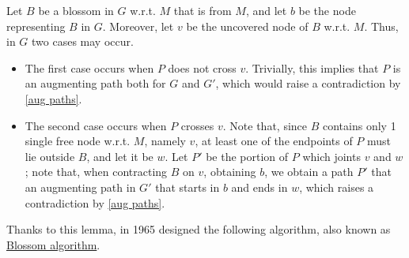 \documentclass[a4paper, 12pt]{report}
\begin{document}
{        Let $B$ be a blossom in $G$ w.r.t. $M$ that is  from $M$, and let $b$ be the node representing $B$ in $G$. Moreover, let $v$ be the uncovered node of $B$ w.r.t. $M$. Thus, in $G$ two cases may occur.

        \begin{itemize}
            \item The first case occurs when $P$ does not cross $v$. Trivially, this implies that $P$ is an augmenting path both for $G$ and $G'$, which would raise a contradiction by \cref{aug paths}.
            \item The second case occurs when $P$ crosses $v$. Note that, since $B$ contains only 1 single free node w.r.t. $M$, namely $v$, at least one of the endpoints of $P$ must lie outside $B$, and let it be $w$. Let $P'$ be the portion of $P$ which joints $v$ and $w$; note that, when contracting $B$ on $v$, obtaining $b$, we obtain a path $P'$ that an augmenting path in $G'$ that starts in $b$ and ends in $w$, which raises a contradiction by \cref{aug paths}.
        \end{itemize}
    }

    Thanks to this lemma, in 1965 \textcite{edmonds} designed the following algorithm, also known as \href{https://en.wikipedia.org/wiki/Blossom_algorithm}{Blossom algorithm}.

\end{document}
